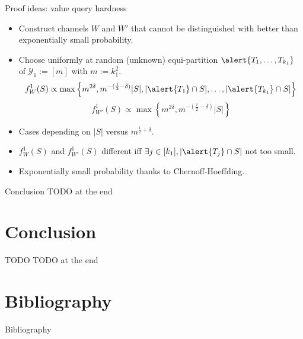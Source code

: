 \documentclass{beamer}
\theoremstyle{definition}
\theoremstyle{remark}
\begin{document}
\begin{frame}{Proof ideas: value query hardness}
  \begin{itemize}
  \item Construct channels $W$ and $W'$ that cannot be distinguished with better than exponentially small probability.
    \pause
    \bigskip
  \item Choose uniformly at random (unknown) equi-partition $\alert{T_1,\ldots,T_{k_1}}$ of $\mathcal{Y}_1 := [m]$ with $m:=k_1^2$.
    \pause
    \[ f_W^1(S) \propto \max\left\{ m^{2\delta}, m^{-(\frac{1}{2}-\delta)}|S|, |\alert{T_1} \cap S|,\ldots,|\alert{T_{k_1}} \cap S|\right\} \]
    \[ f_{W'}^1(S) \propto \max\left\{ m^{2\delta}, m^{-(\frac{1}{2}-\delta)}|S|\right\} \]
    \pause
  \item Cases depending on $|S|$ versus $ m^{\frac{1}{2}+\delta}$.
  \item $f_W^1(S)$ and $f_{W'}^1(S)$ different iff $\exists j \in [k_1], |\alert{T_j} \cap S|$ not too small.
  \item Exponentially small probability thanks to Chernoff-Hoeffding.
  \end{itemize}
\end{frame}

\begin{frame}{Conclusion}
  TODO at the end
\end{frame}

\section{Conclusion}
\begin{frame}{TODO}
  TODO at the end
\end{frame}

\appendix
\section{Bibliography}
\begin{frame}[allowframebreaks]{Bibliography}
  
  
\end{frame}

\end{document}
